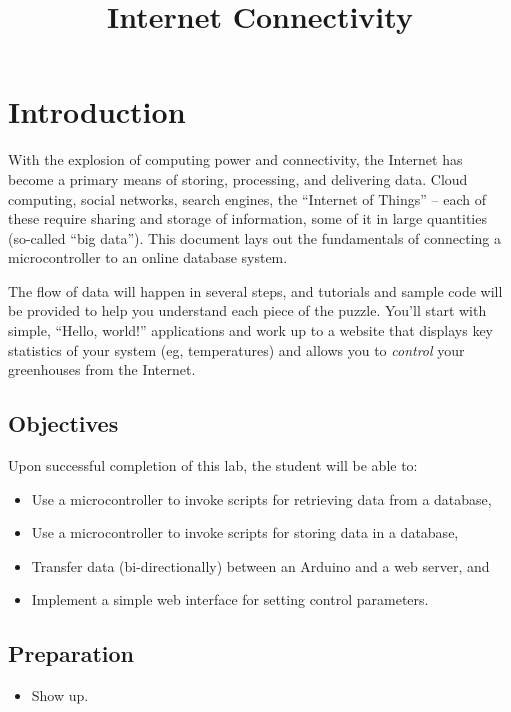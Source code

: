 \documentclass[11pt]{article} %
\title{Internet Connectivity}
\author{}
\date{} %
\begin{document}
\maketitle


\section*{Introduction}

With the explosion of computing power and connectivity, the Internet has become a primary means of storing, processing, and delivering data. Cloud computing, social networks, search engines, the ``Internet of Things'' -- each of these require sharing and storage of information, some of it in large quantities (so-called “big data”). This document lays out the fundamentals of connecting a microcontroller to an online database system.

The flow of data will happen in several steps, and tutorials and sample code will be provided to help you understand each piece of the puzzle. You’ll start with simple, ``Hello, world!'' applications and work up to a website that displays key statistics of your system (eg, temperatures) and allows you to \emph{control} your greenhouses from the Internet.

\subsection*{Objectives}

Upon successful completion of this lab, the student will be able to:
\begin{itemize}
\item Use a microcontroller to invoke scripts for retrieving data from a database,
\item Use a microcontroller to invoke scripts for storing data in a database,
\item Transfer data (bi-directionally) between an Arduino and a web server, and
\item Implement a simple web interface for setting control parameters.
\end{itemize}

\subsection*{Preparation}
\begin{itemize}
\item Show up.
\end{itemize}
\end{document}
